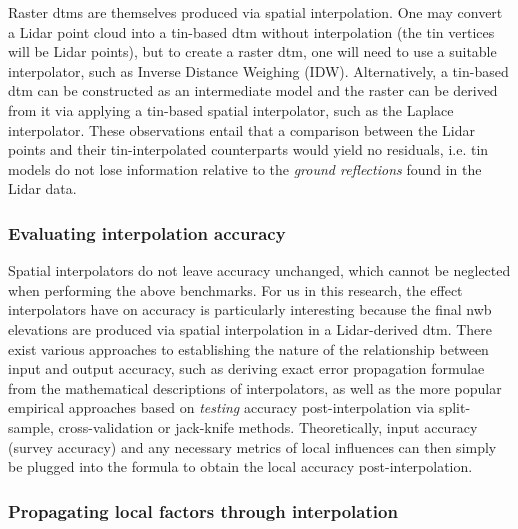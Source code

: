 Raster \ac{dtm}s are themselves produced via spatial interpolation. One may convert a Lidar point cloud into a \ac{tin}-based \ac{dtm} without interpolation (the \ac{tin} vertices will be Lidar points), but to create a raster \ac{dtm}, one will need to use a suitable interpolator, such as Inverse Distance Weighing (IDW). Alternatively, a \ac{tin}-based \ac{dtm} can be constructed as an intermediate model and the raster can be derived from it via applying a \ac{tin}-based spatial interpolator, such as the Laplace interpolator. These observations entail that a comparison between the Lidar points and their \ac{tin}-interpolated counterparts would yield no residuals, i.e. \ac{tin} models do not lose information relative to the \textit{ground reflections} found in the Lidar data.

\subsubsection{Evaluating interpolation accuracy}

Spatial interpolators do not leave accuracy unchanged, which cannot be neglected when performing the above benchmarks. For us in this research, the effect interpolators have on accuracy is particularly interesting because the final \ac{nwb} elevations are produced via spatial interpolation in a Lidar-derived \ac{dtm}. There exist various approaches to establishing the nature of the relationship between input and output accuracy, such as deriving exact error propagation formulae from the mathematical descriptions of interpolators, as well as the more popular empirical approaches based on \textit{testing} accuracy post-interpolation via split-sample, cross-validation or jack-knife methods. Theoretically, input accuracy (survey accuracy) and any necessary metrics of local influences can then simply be plugged into the formula to obtain the local accuracy post-interpolation.

\subsubsection{Propagating local factors through interpolation}

